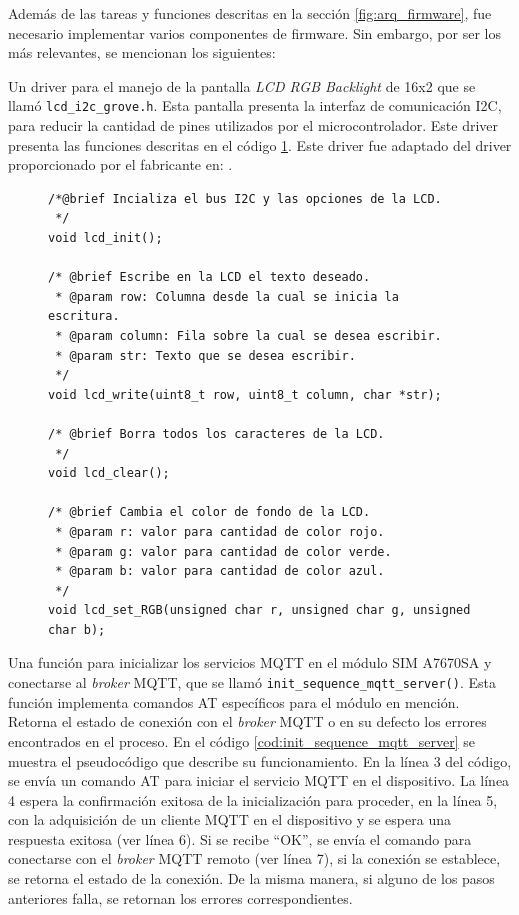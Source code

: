 Además de las tareas y funciones descritas en la sección \ref{fig:arq_firmware}, fue necesario implementar varios componentes de firmware. Sin embargo, por ser los más relevantes, se mencionan los siguientes:

Un driver para el manejo de la pantalla \textit{LCD RGB Backlight} de 16x2 que se llamó \verb|lcd_i2c_grove.h|. Esta pantalla presenta la interfaz de comunicación I2C, para reducir la cantidad de pines utilizados por el microcontrolador. Este driver presenta las funciones descritas en el código \ref{cod:driver_lcd}. Este driver fue adaptado del driver proporcionado por el fabricante en: \citep{LCD_GROVE}.

\begin{figure}[H]
\begin{lstlisting}
/*@brief Incializa el bus I2C y las opciones de la LCD.
 */
void lcd_init();

/* @brief Escribe en la LCD el texto deseado.
 * @param row: Columna desde la cual se inicia la escritura.
 * @param column: Fila sobre la cual se desea escribir.
 * @param str: Texto que se desea escribir.
 */
void lcd_write(uint8_t row, uint8_t column, char *str);

/* @brief Borra todos los caracteres de la LCD.
 */
void lcd_clear();

/* @brief Cambia el color de fondo de la LCD.
 * @param r: valor para cantidad de color rojo.
 * @param g: valor para cantidad de color verde.
 * @param b: valor para cantidad de color azul.
 */
void lcd_set_RGB(unsigned char r, unsigned char g, unsigned char b);

\end{lstlisting}
\label{cod:driver_lcd}
\end{figure}
 

Una función para inicializar los servicios MQTT en el módulo SIM A7670SA y conectarse al \textit{broker} MQTT, que se llamó \verb|init_sequence_mqtt_server()|. Esta función implementa comandos AT específicos para el módulo en mención. Retorna el estado de conexión con el \textit{broker} MQTT o en su defecto los errores encontrados en el proceso. En el código \ref{cod:init_sequence_mqtt_server} se muestra el pseudocódigo que describe su funcionamiento. En la línea 3 del código, se envía un comando AT para iniciar el servicio MQTT en el dispositivo. La línea 4 espera la confirmación exitosa de la inicialización para proceder, en la línea 5, con la adquisición de un cliente MQTT en el dispositivo y se espera una respuesta exitosa (ver línea 6). Si se recibe ``OK'', se envía el comando para conectarse con el \textit{broker} MQTT remoto (ver línea 7), si la conexión se establece, se retorna el estado de la conexión. De la misma manera, si alguno de los pasos anteriores falla, se retornan los errores correspondientes. 

